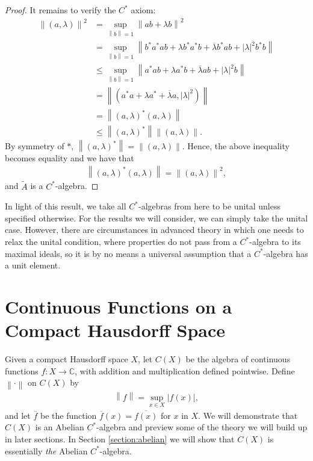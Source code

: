 \documentclass[11pt,a4paper]{report}
\theoremstyle{plain}
\theoremstyle{definition}
\newcommand{\1}{\mathbbm{1}}
\newcommand{\C}{\mathbb{C}}
\newcommand{\CX}{C(X)}
\begin{document}
\begin{proof}
	It remains to verify the $C^\ast$ axiom:
	\begin{align*}
				\left\|(a,\lambda)\right\|^2 
		&=		\sup_{\left\|b\right\|=1}{\left\| ab+\lambda b\right \|^2}						\\
		&=		\sup_{\left\|b\right\|=1}{\left\| b^\ast a^\ast ab 
								+\lambda b^\ast a^\ast b
								+\overline{\lambda}b^\ast a b 
								+|\lambda|^2 b^\ast b \right\|}									\\
		&\leq	\sup_{\left\|b\right\|=1}{\left\| a^\ast ab 
								+\lambda a^\ast b
								+\overline{\lambda}a b
								+\left|\lambda\right|^2 b\right\|}								\\
		&=		\left\|(a^\ast a + \lambda a^\ast +\overline{\lambda}a,|\lambda|^2)\right\|		\\
		&= 		\left\|(a,\lambda)^\ast(a,\lambda)\right\|										\\
		&\leq	\left\|(a,\lambda)^\ast\right\| \left\|(a,\lambda)\right\|.
	\end{align*}
	By symmetry of $\ast$, $\left\|(a,\lambda)^\ast\right\| = \left\|(a,\lambda)\right\|$. 
	Hence, the above inequality becomes equality and we have that
	\begin{align*}
		\left\|(a,\lambda)^\ast(a,\lambda)\right\| = \left\|(a,\lambda)\right\|^2,
	\end{align*}
	and $\tilde A$ is a $C^\ast$-algebra.
\end{proof}

In light of this result, we take all $C^\ast$-algebras from here to be unital 
unless specified otherwise. For the results we will consider, we can simply take 
the unital case. However, there are circumstances in advanced theory in which 
one needs to relax the unital condition, where properties do not pass from a 
$C^\ast$-algebra to its maximal ideals, so it is by no means a universal 
assumption that a $C^\ast$-algebra has a unit element.


\section{Continuous Functions on a Compact Hausdorff Space} \label{section:CX}
Given a compact Hausdorff space $X$, let $\CX$ be the algebra of continuous 
functions $f:X\to\C$, with addition and multiplication defined pointwise. 
Define $\left\|\cdot\right\|$ on $\CX$ by
\begin{align*}
	\left\|f\right\|= \sup_{x\in X}{\left|f(x)\right|},
\end{align*}
and let $\overline f$ be the function $\overline f(x) = \overline{f(x)}$ for 
$x$ in $X$. We will demonstrate that $\CX$ is an Abelian $C^\ast$-algebra and 
preview some of the theory we will build up in later sections. In 
Section \ref{section:abelian} we will show that $\CX$ is essentially \emph{the} 
Abelian $C^\ast$-algebra.
\end{document}
